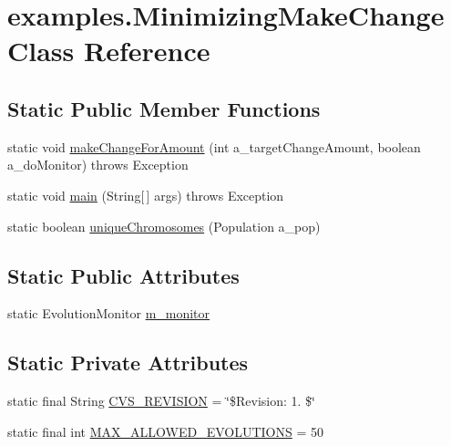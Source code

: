 \hypertarget{classexamples_1_1_minimizing_make_change}{\section{examples.\-Minimizing\-Make\-Change Class Reference}
\label{classexamples_1_1_minimizing_make_change}
}
\subsection*{Static Public Member Functions}
\begin{DoxyCompactItemize}
\item 
static void \hyperlink{classexamples_1_1_minimizing_make_change_afdb27e2502d878504a6fc01d09c2e46f}{make\-Change\-For\-Amount} (int a\-\_\-target\-Change\-Amount, boolean a\-\_\-do\-Monitor)  throws Exception 
\item 
static void \hyperlink{classexamples_1_1_minimizing_make_change_ae1370fb6d40b6403426fc0f715a295b1}{main} (String\mbox{[}$\,$\mbox{]} args)  throws Exception 
\item 
static boolean \hyperlink{classexamples_1_1_minimizing_make_change_ae1d908d7ed6d86e7bec37ff6172aa7b3}{unique\-Chromosomes} (Population a\-\_\-pop)
\end{DoxyCompactItemize}
\subsection*{Static Public Attributes}
\begin{DoxyCompactItemize}
\item 
static Evolution\-Monitor \hyperlink{classexamples_1_1_minimizing_make_change_ac2bd233483d61d35e663cdcde7fae07a}{m\-\_\-monitor}
\end{DoxyCompactItemize}
\subsection*{Static Private Attributes}
\begin{DoxyCompactItemize}
\item 
static final String \hyperlink{classexamples_1_1_minimizing_make_change_a0de48783b67c152af30702448f6c02d0}{C\-V\-S\-\_\-\-R\-E\-V\-I\-S\-I\-O\-N} = \char`\"{}\$Revision\-: 1. \$\char`\"{}
\item 
static final int \hyperlink{classexamples_1_1_minimizing_make_change_ae2d2ac25bf02f1feff515e58a908557c}{M\-A\-X\-\_\-\-A\-L\-L\-O\-W\-E\-D\-\_\-\-E\-V\-O\-L\-U\-T\-I\-O\-N\-S} = 50
\end{DoxyCompactItemize}


